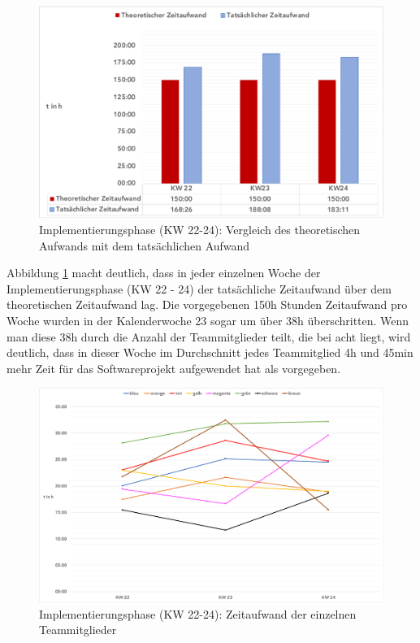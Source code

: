 \documentclass[../review_2.tex]{subfiles}
\begin{document}
\begin{figure} [h]
    \centering
    \includegraphics[width = \linewidth]{img/kimai7.pdf}
    \caption{Implementierungsphase (KW 22-24): Vergleich des theoretischen Aufwands mit dem tatsächlichen Aufwand}
    \label{kimai7}
\end{figure} 
Abbildung \ref{kimai7} macht deutlich, dass in jeder einzelnen Woche der Implementierungsphase (KW 22 - 24) der tatsächliche Zeitaufwand über dem theoretischen Zeitaufwand lag. Die vorgegebenen 150h Stunden Zeitaufwand pro Woche wurden in der Kalenderwoche 23 sogar um über 38h überschritten. Wenn man diese 38h durch die Anzahl der Teammitglieder teilt, die bei acht liegt, wird deutlich, dass in dieser Woche im Durchschnitt jedes Teammitglied 4h und 45min mehr Zeit für das Softwareprojekt aufgewendet hat als vorgegeben.
\begin{figure} [h]
    \centering
    \includegraphics[width = \linewidth]{img/kimai9.pdf}
    \caption{Implementierungsphase (KW 22-24): Zeitaufwand der einzelnen Teammitglieder}
    \label{kimai9}
\end{figure} 
\end{document}
